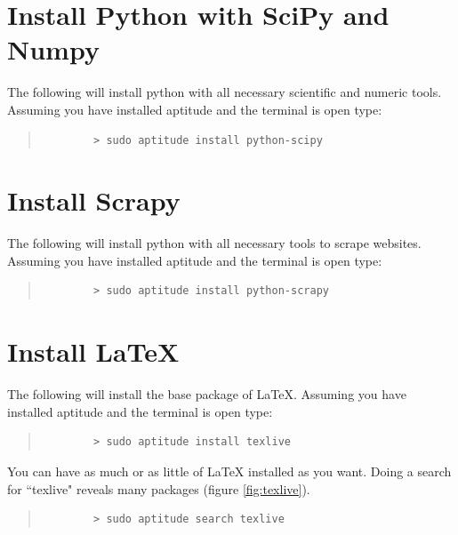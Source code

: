 \documentclass[11pt]{article}
\begin{document}
\section{Install Python with SciPy and Numpy}

The following will install python with all necessary scientific and numeric tools.  Assuming you have installed aptitude and the terminal is open type:

\begin{quote}
	\begin{verbatim}
		> sudo aptitude install python-scipy
	\end{verbatim}
\end{quote}

\section{Install Scrapy}

The following will install python with all necessary tools to scrape websites.  Assuming you have installed aptitude and the terminal is open type:

\begin{quote}
	\begin{verbatim}
		> sudo aptitude install python-scrapy
	\end{verbatim}
\end{quote}

\section{Install LaTeX}

The following will install the base package of LaTeX.  Assuming you have installed aptitude and the terminal is open type:

\begin{quote}
	\begin{verbatim}
		> sudo aptitude install texlive
	\end{verbatim}
\end{quote}

You can have as much or as little of LaTeX installed as you want.  Doing a search for ``texlive" reveals many packages (figure \ref{fig:texlive}).

\begin{quote}
	\begin{verbatim}
		> sudo aptitude search texlive
	\end{verbatim}
\end{quote}
  
\end{document}
